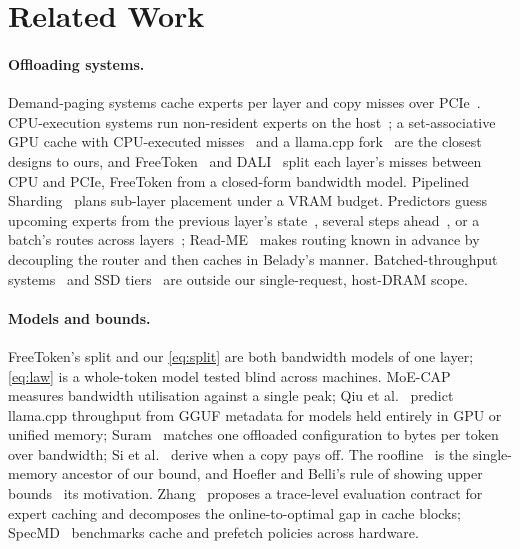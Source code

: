 \documentclass[10pt,twocolumn]{article}
\begin{document}
\section{Related Work}\label{sec:related}
\paragraph{Offloading systems.} Demand-paging systems cache experts per layer and copy misses over
PCIe~\cite{eliseev2023offloading,xue2024moeinfinity,song2024promoe,tang2024hobbit}. CPU-execution systems run
non-resident experts on the host~\cite{kamahori2024fiddler,ktransformers,zhong2025hybrimoe,daop2025,wang2026cloudgrade};
a set-associative GPU cache with CPU-executed misses~\cite{huang2025cpugpu} and a llama.cpp fork~\cite{leloch2026,llamacppdisc24528}
are the closest designs to ours, and FreeToken~\cite{freetoken} and DALI~\cite{dali2026} split each layer's misses
between CPU and PCIe, FreeToken from a closed-form bandwidth model. Pipelined Sharding~\cite{pipelinedsharding2026}
plans sub-layer placement under a VRAM budget. Predictors guess upcoming experts from the previous layer's
state~\cite{hwang2024pregated,zhu2025preattention}, several steps ahead~\cite{wang2026seqmoe}, or a batch's routes
across layers~\cite{expertflow}; Read-ME~\cite{readme2024} makes routing known in advance by decoupling the router and
then caches in Belady's manner. Batched-throughput systems~\cite{cao2024moelightning,yuan2025moelens} and SSD
tiers~\cite{ssdllama,edgezero} are outside our single-request, host-DRAM scope.

\paragraph{Models and bounds.} FreeToken's split and our \cref{eq:split} are both bandwidth models of one layer;
\cref{eq:law} is a whole-token model tested blind across machines. MoE-CAP~\cite{moecap} measures bandwidth
utilisation against a single peak; Qiu et al.~\cite{qiu2026gguf} predict llama.cpp throughput from GGUF metadata for models held
entirely in GPU or unified memory; Suram~\cite{cacheable} matches one offloaded configuration to bytes per token over
bandwidth; Si et al.~\cite{si2026expertcache} derive when a copy pays off. The roofline~\cite{williams2009roofline} is the
single-memory ancestor of our bound, and Hoefler and Belli's rule of showing upper bounds~\cite{hoefler2015benchmarking}
its motivation. Zhang~\cite{zhang2026reproducible} proposes a trace-level evaluation contract for expert caching and
decomposes the online-to-optimal gap in cache blocks; SpecMD~\cite{specmd} benchmarks cache and prefetch policies across
hardware.
\end{document}
